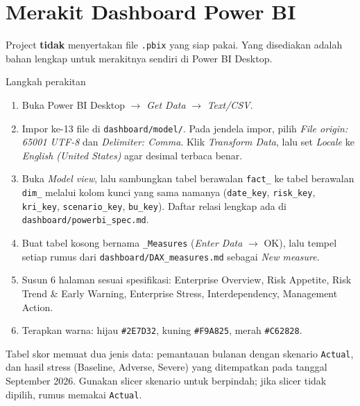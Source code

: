 \documentclass[11pt,a4paper]{article}
\newcommand{\file}[1]{\texttt{\small #1}}
\begin{document}
\section{Merakit Dashboard Power BI}\label{sec:powerbi}

Project \textbf{tidak} menyertakan file \file{.pbix} yang siap pakai. Yang disediakan adalah bahan lengkap untuk merakitnya sendiri di Power BI Desktop.

\begin{stepbox}{Langkah perakitan}
\begin{enumerate}
\item Buka Power BI Desktop $\rightarrow$ \emph{Get Data} $\rightarrow$ \emph{Text/CSV}.
\item Impor ke-13 file di \file{dashboard/model/}. Pada jendela impor, pilih \emph{File origin: 65001 UTF-8} dan \emph{Delimiter: Comma}. Klik \emph{Transform Data}, lalu set \emph{Locale} ke \emph{English (United States)} agar desimal terbaca benar.
\item Buka \emph{Model view}, lalu sambungkan tabel berawalan \file{fact\_\allowbreak{}} ke tabel berawalan \file{dim\_\allowbreak{}} melalui kolom kunci yang sama namanya (\file{date\_\allowbreak{}key}, \file{risk\_\allowbreak{}key}, \file{kri\_\allowbreak{}key}, \file{scenario\_\allowbreak{}key}, \file{bu\_\allowbreak{}key}). Daftar relasi lengkap ada di \file{dashboard/powerbi\_\allowbreak{}spec.md}.
\item Buat tabel kosong bernama \file{\_\allowbreak{}Measures} (\emph{Enter Data} $\rightarrow$ OK), lalu tempel setiap rumus dari \file{dashboard/DAX\_\allowbreak{}measures.md} sebagai \emph{New measure}.
\item Susun 6 halaman sesuai spesifikasi: Enterprise Overview, Risk Appetite, Risk Trend \& Early Warning, Enterprise Stress, Interdependency, Management Action.
\item Terapkan warna: hijau \texttt{\#2E7D32}, kuning \texttt{\#F9A825}, merah \texttt{\#C62828}.
\end{enumerate}
\end{stepbox}

\begin{infobox}
Tabel skor memuat dua jenis data: pemantauan bulanan dengan skenario \texttt{Actual}, dan hasil stress (Baseline, Adverse, Severe) yang ditempatkan pada tanggal September 2026. Gunakan slicer skenario untuk berpindah; jika slicer tidak dipilih, rumus memakai \texttt{Actual}.
\end{infobox}
\end{document}
